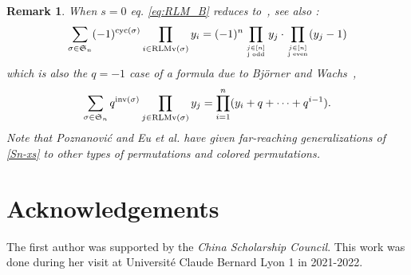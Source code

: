 \documentclass[12pt,reqno]{amsart}
\numberwithin{equation}{section}
\newcommand\inv{\mathop{ \rm inv}}
\newcommand\sor{\mathop{ \rm sor}}
\newcommand\cyc{\mathop{ \rm cyc}}
\def\S{\mathfrak{ S}}
\def\cyc{\mathop{\rm cyc}}
\def\sor{\mathop{\rm sor}}
\newtheorem{rem}{Remark}
\begin{document}
\begin{rem} When $s=0$ eq. \eqref{eq:RLM_B} reduces to~\cite[Corollary 22]{AG21a}, see also \cite[Corollary 36]{AG21}:
\begin{align}\label{ag21:RLMv_A}
	\sum_{\sigma\in\S_n}(-1)^{\cyc(\sigma)}\prod_{i\in\mathrm{RLMv}(\sigma)}y_i=(-1)^n \prod_{j\in [n]\atop
		\textrm{j odd}} y_j\cdot \prod_{j\in [n]\atop\textrm{j even}} (y_j-1)
\end{align}
which  is also the $q=-1$ case of a formula 
due to  Bj\"orner and Wachs~\cite[(5.3)]{BW91}, 
\begin{align}\label{Sn-xs}
	\sum_{\sigma\in\S_n}q^{\inv (\sigma)}
	\prod_{j\in\mathrm{RLMv}(\sigma)}y_j
	=\prod_{i=1}^{n}(y_i+q+\cdots+q^{i-1}).
\end{align}
Note that Poznanovi\'c \cite{Po14} and Eu et al. \cite{ELW15}
have given far-reaching generalizations of  \eqref{Sn-xs} to 
 other types of permutations  and  colored permutations.
\end{rem}

\section{Acknowledgements}
The first author was
supported by the \emph{China Scholarship Council}.
This work was done during
her  visit  at  Universit\'e
Claude Bernard Lyon 1 in 2021-2022.
\end{document}
